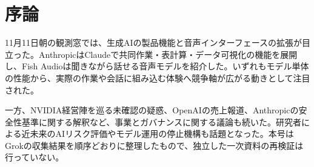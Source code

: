 \section{序論}
11月11日朝の観測窓では、生成AIの製品機能と音声インターフェースの拡張が目立った。AnthropicはClaudeで共同作業・表計算・データ可視化の機能を展開し、Fish Audioは聞きながら話せる音声モデルを紹介した。いずれもモデル単体の性能から、実際の作業や会話に組み込む体験へ競争軸が広がる動きとして注目された。

一方、NVIDIA経営陣を巡る未確認の疑惑、OpenAIの売上報道、Anthropicの安全性基準に関する解釈など、事業とガバナンスに関する議論も続いた。研究者による近未来のAIリスク評価やモデル運用の停止機構も話題となった。本号はGrokの収集結果を順序どおりに整理したもので、独立した一次資料の再検証は行っていない。

